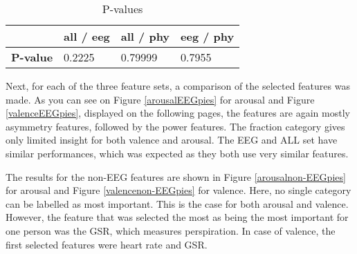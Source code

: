 \begin{table}[H]
\centering
\begin{tabular}{l|lll}
	    & \textbf{all / eeg} & \textbf{all / phy} & \textbf{eeg / phy} \\ \hline
\textbf{P-value} & 0.2225             & 0.79999            & 0.7955            
\end{tabular}
\caption{P-values\label{pvals}}
\end{table}
\clearpage

Next, for each of the three feature sets, a comparison of the selected features was made. As you can see on Figure \ref{arousalEEGpies} for arousal and Figure \ref{valenceEEGpies}, displayed on the following pages, the features are again mostly asymmetry features, followed by the power features. The fraction category gives only limited insight for both valence and arousal. The EEG and ALL set have similar performances, which was expected as they both use very similar features.

\npar

The results for the non-EEG features are shown in Figure \ref{arousalnon-EEGpies} for arousal and Figure \ref{valencenon-EEGpies} for valence.
Here, no single category can be labelled as most important. This is the case for both arousal and valence. However, the feature that was selected the most as being the most important for one person was the GSR, which measures perspiration. In case of valence, the first selected features were heart rate and GSR.

